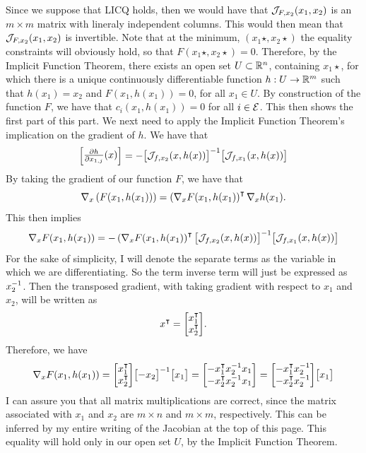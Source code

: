 \begin{solution}
    Since we suppose that LICQ holds, then we would have that $\mathcal{J}_{F, x_2}(x_1, x_2)$ is an $m \times m$ matrix with lineraly independent columns. This would then mean that $\mathcal{J}_{F, x_2}(x_1, x_2)$ is invertible. Note that at the minimum, $(x_1\star, x_2\star)$ the equality constraints will obviously hold, so that $F(x_1\star, x_2\star) = 0$. Therefore, by the Implicit Function Theorem, there exists an open set $U \subset \mathbb{R}^n$, containing $x_1\star$, for which there is a unique continuously differentiable function $h: U \rightarrow \mathbb{R}^m$ such that $h(x_1) = x_2$ and $F(x_1, h(x_1)) = 0$, for all $x_1 \in U$. By construction of the function $F$, we have that $c_i(x_1, h(x_1)) = 0 $ for all $i \in \mathcal{E}$. This then shows the first part of this part. We next need to apply the Implicit Function Theorem's implication on the gradient of $h$. We have that 
    \[\mqty[\frac{\partial h}{\partial x_{1, j}}(x)] = -\mqty[\scJ_{f, x_2}(x, h(x))]\inv \mqty[\scJ_{f, x_1}(x, h(x))]\] 
    By taking the gradient of our function $F$, we have that
    \[\nabla_x \left(F(x_1, h(x_1))\right) = \left( \nabla_xF(x_1, h(x_1)\right)^{\intercal} \nabla_x h(x_1).\]
    This then implies
    \[\grad_x F(x_1, h(x_1)) =  -\left( \grad_xF(x_1, h(x_1)\right)\T \mqty[\scJ_{f, x_2}(x, h(x))]\inv \mqty[\scJ_{f, x_1}(x, h(x))]\]
    For the sake of simplicity, I will denote the separate terms as the variable in which we are differentiating. So the term inverse term will just be expressed as $x_2^{-1}$. Then the transposed gradient, with taking gradient with respect to $x_1$ and $x_2$, will be written as 
    \[x\T = \mqty[x_1\T \\x_2\T].\]
    Therefore, we have 
    \[\grad_x F(x_1, h(x_1)) = \mqty[x_1\T \\x_2\T] \mqty[-x_2]\inv \mqty[x_1] = \mqty[-x_1\T x_2\inv x_1\\-x_2\T x_2\inv x_1] = \mqty[-x_1\T x_2\inv \\-x_2\T x_2\inv]\mqty[x_1]\]
    I can assure you that all matrix multiplications are correct, since the matrix associated with $x_1$ and $x_2$ are $m \times n$ and $m \times m$, respectively. This can be inferred by my entire writing of the Jacobian at the top of this page. This equality will hold only in our open set $U$, by the Implicit Function Theorem.
\end{solution}
\newpage
